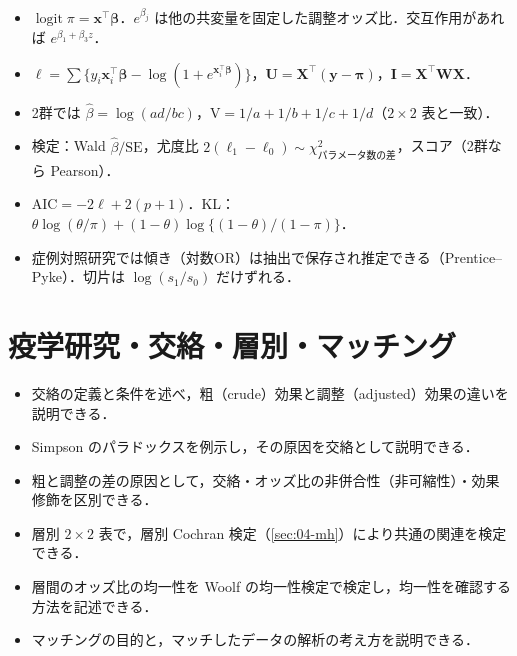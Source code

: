 \documentclass[a4paper,11pt,openany]{ltjsbook}
\newcommand{\V}{\mathrm{V}}
\newcommand{\SE}{\mathrm{SE}}
\newcommand{\logit}{\operatorname{logit}}
\newcommand{\transp}{^{\top}}
\begin{document}
\begin{summarybox}
\begin{itemize}
\item $\logit\pi=\bm x\transp\bm\beta$．$e^{\beta_j}$ は他の共変量を固定した調整オッズ比．交互作用があれば $e^{\beta_1+\beta_3z}$．
\item $\ell=\sum\{y_i\bm x_i\transp\bm\beta-\log(1+e^{\bm x_i\transp\bm\beta})\}$，$\bm U=\bm X\transp(\bm y-\bm\pi)$，$\bm I=\bm X\transp\bm W\bm X$．
\item 2群では $\hat\beta=\log(ad/bc)$，$\V=1/a+1/b+1/c+1/d$（$2\times2$ 表と一致）．
\item 検定：Wald $\hat\beta/\SE$，尤度比 $2(\ell_1-\ell_0)\sim\chi^2_{\text{パラメータ数の差}}$，スコア（2群なら Pearson）．
\item $\mathrm{AIC}=-2\ell+2(p+1)$．KL：$\theta\log(\theta/\pi)+(1-\theta)\log\{(1-\theta)/(1-\pi)\}$．
\item 症例対照研究では傾き（対数OR）は抽出で保存され推定できる（Prentice--Pyke）．切片は $\log(s_1/s_0)$ だけずれる．
\end{itemize}
\end{summarybox}

\chapter{疫学研究・交絡・層別・マッチング}\label{ch:07}

\begin{goalbox}
\begin{itemize}
\item 交絡の定義と条件を述べ，粗（crude）効果と調整（adjusted）効果の違いを説明できる．
\item Simpson のパラドックスを例示し，その原因を交絡として説明できる．
\item 粗と調整の差の原因として，交絡・オッズ比の非併合性（非可縮性）・効果修飾を区別できる．
\item 層別 $2\times2$ 表で，層別 Cochran 検定（\cref{sec:04-mh}）により共通の関連を検定できる．
\item 層間のオッズ比の均一性を Woolf の均一性検定で検定し，均一性を確認する方法を記述できる．
\item マッチングの目的と，マッチしたデータの解析の考え方を説明できる．
\end{itemize}
\end{goalbox}
\end{document}
